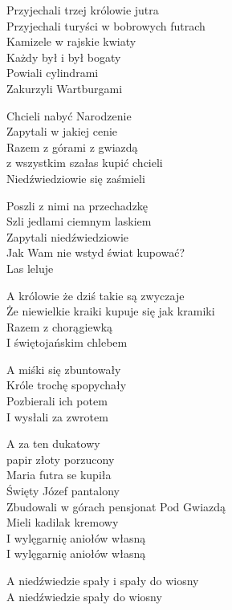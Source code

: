 \begin{text}
Przyjechali trzej królowie jutra\\
Przyjechali turyści w bobrowych futrach\\
Kamizele w rajskie kwiaty\\
Każdy był i był bogaty\\
Powiali cylindrami\\
Zakurzyli Wartburgami

Chcieli nabyć Narodzenie\\
Zapytali w jakiej cenie\\
Razem z górami z gwiazdą\\
z wszystkim szałas kupić chcieli\\
Niedźwiedziowie się zaśmieli

Poszli z nimi na przechadzkę\\
Szli jedlami ciemnym laskiem\\
Zapytali niedźwiedziowie\\
Jak Wam nie wstyd świat kupować?\\
Las leluje

A królowie że dziś takie są zwyczaje\\
Że niewielkie kraiki kupuje się jak kramiki\\
Razem z chorągiewką\\
I świętojańskim chlebem

A miśki się zbuntowały\\
Króle trochę spopychały\\
Pozbierali ich potem\\
I wysłali za zwrotem

A za ten dukatowy\\
papir złoty porzucony\\
Maria futra se kupiła\\
Święty Józef pantalony\\
Zbudowali w górach pensjonat Pod Gwiazdą\\
Mieli kadilak kremowy\\
I wylęgarnię aniołów własną\\
I wylęgarnię aniołów własną

A niedźwiedzie spały i spały do wiosny\\
A niedźwiedzie spały do wiosny
\end{text}
\begin{chord}
\end{chord}